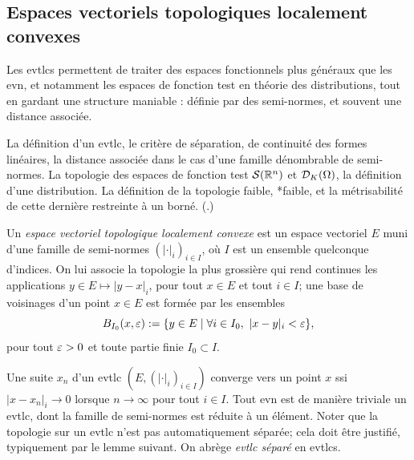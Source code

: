 \subsection{Espaces vectoriels topologiques localement convexes} 
\label{subsec:evtlc}

Les evtlcs permettent de traiter des espaces fonctionnels plus généraux que les evn, et notamment les espaces de fonction test en théorie des distributions, tout en gardant une structure maniable : définie par des semi-normes, et souvent une distance associée. %


\begin{retenir}
La définition d'un evtlc, le critère de séparation, de continuité des formes linéaires, la distance associée dans le cas d'une famille dénombrable de semi-normes. La topologie des espaces de fonction test $\mathcal{S}(\mathbb{R}^n)$ et $\mathcal{D}_K(\Omega)$, la définition d'une distribution. La définition de la topologie faible, *faible, et la métrisabilité de cette dernière restreinte à un borné. 
(.)
\end{retenir}



\begin{definition}[evtlc]
\label{def:evtlc}
%
	Un \emph{espace vectoriel topologique localement convexe} est un espace vectoriel $E$ muni d'une famille de semi-normes $(|\cdot|_i)_{i \in I}$, où $I$ est un ensemble quelconque d'indices. On lui associe la topologie la plus grossière qui rend continues les applications $y \in E \mapsto |y-x|_i$, pour tout $x \in E$ et tout $i \in I$; une base de voisinages d'un point $x \in E$ est formée par les ensembles 
\begin{equation}	
\label{eq:evtlc_vois}
	B_{I_0}(x,\ve) := \{y \in E \mid \forall i \in I_0,\ |x-y|_i < \ve\},
\leancheck{eq:evtlc_vois}%
\end{equation}
pour tout $\varepsilon>0$ et toute partie finie $I_0 \subset I$.
\end{definition}

Une suite $x_n$ d'un evtlc $(E,(|\cdot|_i)_{i \in I})$ converge vers un point $x$ ssi $|x-x_n|_i \to 0$ lorsque $n \to \infty$ pour tout $i \in I$.
Tout evn est de manière triviale un evtlc, dont la famille de semi-normes est réduite à un élément. 
Noter que la topologie sur un evtlc n'est pas automatiquement séparée; cela doit être justifié, typiquement par le lemme suivant. On abrège \emph{evtlc séparé} en evtlcs.

